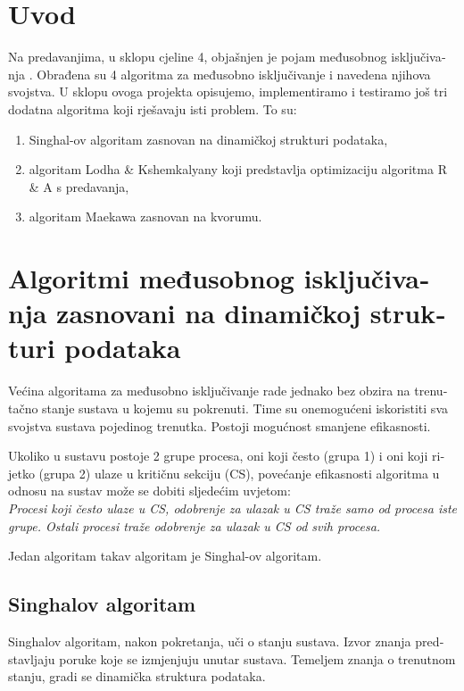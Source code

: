 \documentclass[12pt]{rectors}
\begin{document}
	\begin{otherlanguage}{croatian}
		
\newtheorem{thm}{Teorem}[section]
\newtheorem{defn}[thm]{Definicija}		

\tableofcontents{}
\vfill{}
\newpage
{}
\section[Uvod]{Uvod}
Na predavanjima, u sklopu cjeline 4, objašnjen je pojam međusobnog isključivanja \cite{manger}.
Obrađena su 4 algoritma za međusobno isključivanje i navedena njihova svojstva.
U sklopu ovoga projekta opisujemo, implementiramo i testiramo još tri dodatna algoritma 
koji rješavaju isti problem.
To su:
\begin{enumerate}
	\item Singhal-ov algoritam zasnovan na 
	dinamičkoj strukturi podataka,
	\item algoritam Lodha \& Kshemkalyany koji predstavlja optimizaciju 
	algoritma R \& A s predavanja,
	\item algoritam Maekawa zasnovan na kvorumu.
\end{enumerate}
\section{Algoritmi međusobnog isključivanja zasnovani na dinamičkoj strukturi podataka}
Većina algoritama za međusobno isključivanje rade jednako bez obzira na trenutačno stanje sustava u kojemu su pokrenuti. Time su onemogućeni iskoristiti sva svojstva sustava pojedinog trenutka. Postoji mogućnost smanjene efikasnosti.

Ukoliko u sustavu postoje 2 grupe procesa, oni koji često (grupa 1) i oni koji rijetko (grupa 2) ulaze u kritičnu sekciju (CS), povećanje efikasnosti algoritma u odnosu na sustav može se dobiti sljedećim uvjetom:\\
\textit{Procesi koji često ulaze u CS, odobrenje za ulazak u CS traže samo od procesa iste grupe. Ostali procesi traže odobrenje za ulazak u CS od svih procesa.}\label{sec:uvijet} 

Jedan algoritam takav algoritam je Singhal-ov algoritam.
\subsection{Singhalov algoritam}
Singhalov algoritam, nakon pokretanja, uči o stanju sustava. Izvor znanja predstavljaju poruke koje se izmjenjuju unutar sustava. Temeljem znanja o trenutnom stanju, gradi se dinamička struktura podataka.


\end{otherlanguage}
\end{document}
